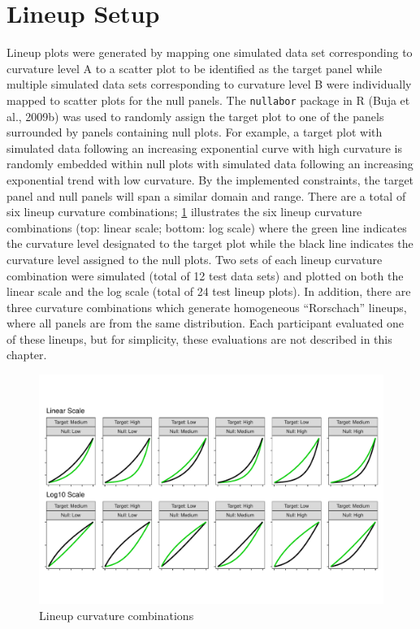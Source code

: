 \documentclass[print]{nuthesis}
\begin{document}
\hypertarget{lineup-setup}{%
\section{Lineup Setup}\label{lineup-setup}}

Lineup plots were generated by mapping one simulated data set corresponding to curvature level A to a scatter plot to be identified as the target panel while multiple simulated data sets corresponding to curvature level B were individually mapped to scatter plots for the null panels.
The \texttt{nullabor} package in R (Buja et al., 2009b) was used to randomly assign the target plot to one of the panels surrounded by panels containing null plots.
For example, a target plot with simulated data following an increasing exponential curve with high curvature is randomly embedded within null plots with simulated data following an increasing exponential trend with low curvature.
By the implemented constraints, the target panel and null panels will span a similar domain and range.
There are a total of six lineup curvature combinations; \cref{fig:curvature-combination-example} illustrates the six lineup curvature combinations (top: linear scale; bottom: log scale) where the green line indicates the curvature level designated to the target plot while the black line indicates the curvature level assigned to the null plots.
Two sets of each lineup curvature combination were simulated (total of 12 test data sets) and plotted on both the linear scale and the log scale (total of 24 test lineup plots).
In addition, there are three curvature combinations which generate homogeneous ``Rorschach'' lineups, where all panels are from the same distribution.
Each participant evaluated one of these lineups, but for simplicity, these evaluations are not described in this chapter.

\begin{figure}[tbp]

{\centering \includegraphics[width=1\linewidth,]{thesis_files/figure-latex/curvature-combination-example-1} 

}

\caption{Lineup curvature combinations}\label{fig:curvature-combination-example}
\end{figure}
\end{document}
